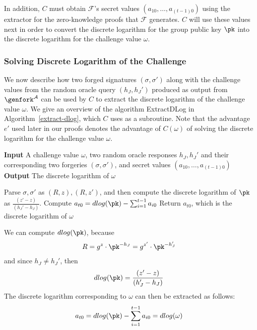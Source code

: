 In addition, $C$ must obtain $\mathcal{F}$'s secret values $(a_{10}, \dots,
a_{(t-1)0})$ using the extractor for the zero-knowledge proofs that
$\mathcal{F}$ generates. $C$ will use these values next in order to convert
the discrete logarithm for the group public key $\pk$ into the discrete logarithm
for the challenge value $\omega$.


\subsubsection{Solving Discrete Logarithm of the Challenge}
\label{compute-dlog-chal}

We now describe how two forged signatures $(\sigma, \sigma')$ along with the
challenge values from the random oracle query $(h_J, h_J')$ produced as
output from $\genfork^\mathcal{A}$ can be used by $C$ to extract the discrete logarithm of the
challenge value  $\omega$. We give an overview of the algorithm ExtractDLog in
Algorithm~\ref{extract-dlog},
which $C$ uses as a subroutine. Note that the
advantage $e'$ used later in our proofs denotes the advantage of $C(\omega)$ of
solving the discrete logarithm for the challenge value $\omega$.

\begin{algorithm}[t]
  \caption{Algorithm ExtractDLog$(\omega, h_J, h_J', (\sigma, \sigma'), (a_{10}, \dots, a_{(t-1)0}))$}
\label{extract-dlog}
     \hspace*{\algorithmicindent} \textbf{Input} A challenge value $\omega$,
     two random oracle responses $h_J, h_J'$ and their corresponding two forgeries $(\sigma, \sigma')$, and secret values
     $(a_{10}, \dots, a_{(t-1)0})$  \\
     \hspace*{\algorithmicindent} \textbf{Output} The discrete logarithm of $\omega$ \\
    \begin{algorithmic}[1]
      \STATE  Parse $\sigma, \sigma'$ as $(R, z), (R, z')$, and then compute
      the discrete logarithm of $\pk$ as $\frac{(z'-z)}{(h_J'-h_J)}$.
      \STATE Compute $a_{t0} = dlog(\pk) - \sum_{i = 1}^{t-1} a_{i0}$
      \STATE Return $a_{t0}$, which is the discrete logarithm of $\omega$
    \end{algorithmic}
\end{algorithm}

We can compute $dlog(\pk)$, because
\[
  R = g^z \cdot \pk^{-h_J} = g^{z'} \cdot \pk^{-h_{J}'}
\]
and since  $h_J \neq h_J'$, then
\[
  dlog(\pk) = \frac{(z'-z)}{(h_J'-h_J)}
\]
The discrete logarithm
corresponding to $\omega$ can then be extracted as follows:
\begin{equation} \label{extract-step}
    a_{t0} = dlog(\pk) - \sum_{i=1}^{t-1} a_{i0} = dlog(\omega)
\end{equation}

